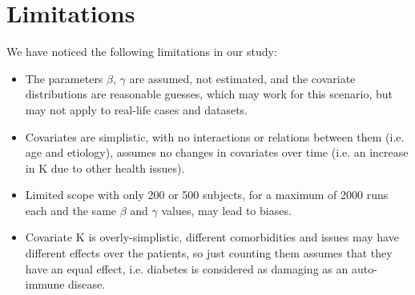 \documentclass[10pt,a4paper]{article}
\begin{document}
\section{Limitations}
We have noticed the following limitations in our study:
\begin{itemize}
    \item The parameters $\beta$, $\gamma$ are assumed, not estimated, and the covariate distributions are reasonable guesses, which may work for this scenario, but may not apply to real-life cases and datasets.
    \item Covariates are simplistic, with no interactions or relations between them (i.e. age and etiology), assumes no changes in covariates over time (i.e. an increase in K due to other health issues).
    \item Limited scope with only 200 or 500 subjects, for a maximum of 2000 runs each and the same $\beta$ and $\gamma$ values, may lead to biases.
    \item Covariate K is overly-simplistic, different comorbidities and issues may have different effects over the patients, so just counting them assumes that they have an equal effect, i.e. diabetes is considered as damaging as an auto-immune disease.
\end{itemize}


\newpage
\end{document}
